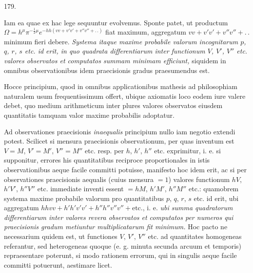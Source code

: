 \begin{center}\hypertarget{native-251-article179}{}179.\end{center}
Iam ea quae ex hac lege sequuntur evolvemus. Sponte patet, ut productum
$\Omega=h^\mu\pi^{-\frac{1}{2}\mu}e^{-hh(vv+v'v'+v''v''+\mathord{.}\,\mathord{.})}$
fiat maximum, aggregatum $vv+v'v'+v''v''+\mathord{.}\,\mathord{.}$ minimum fieri
debere. \emph{Systema itaque maxime probabile valorum incognitarum $p$, $q$, $r$,
$s$ etc. id erit, in quo quadrata differentiarum inter functionum $V$, $V'$,
$V''$ etc. valores observatos et computatos summam minimam efficiunt,} siquidem
in omnibus observationibus idem praecisionis gradus praesumendus est.

Hocce principium, quod in omnibus applicationibus mathesis ad philosophiam
naturalem usum frequentissimum offert, ubique axiomatis loco eodem iure valere
debet, quo medium arithmeticum inter plures valores observatos eiusdem
quantitatis tamquam valor maxime probabilis adoptatur.

Ad observationes praecisionis \emph{inaequalis} principium nullo iam negotio
extendi potest. Scilicet si mensura praecisionis observationum, per quas inventum
est $V=M$, $V'=M'$, $V''=M''$ etc. resp. per $h$, $h'$, $h''$ etc. exprimitur,
i. e. si supponitur, errores his quantitatibus reciproce proportionales in istis
observationibus aeque facile committi potuisse, manifesto hoc idem erit, ac si
per observationes praecisionis aequalis (cuius mensura $=1$) valores functionum
$hV$, $h'V'$, $h''V''$ etc. immediate inventi essent $=hM$, $h'M'$, $h''M''$
etc.: quamobrem systema maxime probabile valorum pro quantitatibus
$p$, $q$, $r$, $s$ etc. id erit, ubi aggregatum
$hhvv+h'h'v'v'+h''h''v''v''+\text{etc.}$, i. e. \emph{ubi summa quadratorum
differentiarum inter valores revera observatos et computatos per numeros qui
praecisionis gradum metiuntur multiplicatarum fit minimum.} Hoc pacto ne
necessarium quidem est, ut functiones $V$, $V'$, $V''$ etc. ad quantitates
homogeneas referantur, sed heterogeneas quoque (e. g. minuta secunda arcuum
et temporis) repraesentare poterunt, si modo rationem errorum, qui in singulis
aeque facile committi potuerunt, aestimare licet.
